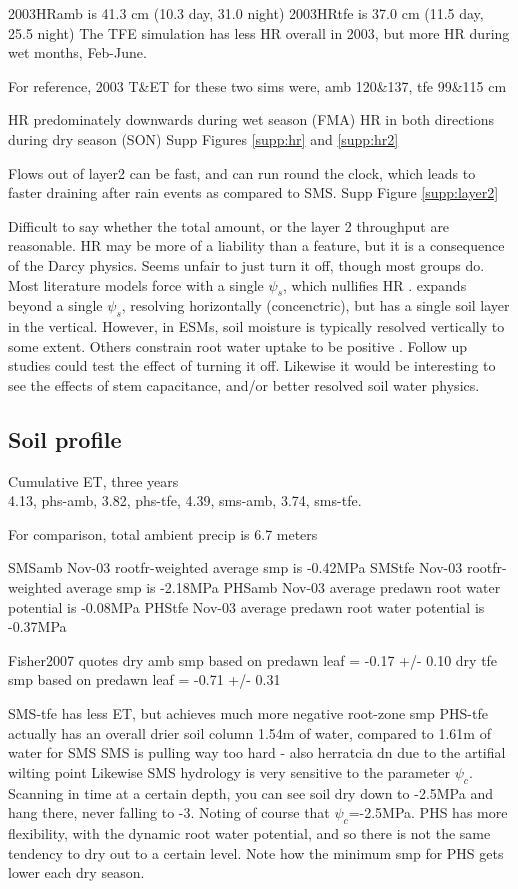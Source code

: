 \documentclass[draft,linenumbers]{agujournal}
\begin{document}
2003HRamb is 41.3 cm (10.3 day, 31.0 night)
2003HRtfe is 37.0 cm (11.5 day, 25.5 night)
The TFE simulation has less HR overall in 2003, but more HR during wet months, Feb-June.

For reference,
2003 T\&ET for these two sims were, amb 120\&137, tfe 99\&115 cm

HR predominately downwards during wet season (FMA)
HR in both directions during dry season (SON)
Supp Figures \ref{supp:hr} and \ref{supp:hr2}

Flows out of layer2 can be fast, and can run round the clock, which leads to faster draining after rain events as compared to SMS.
Supp Figure \ref{supp:layer2}

Difficult to say whether the total amount, or the layer 2 throughput are reasonable.
HR may be more of a liability than a feature, but it is a consequence of the Darcy physics.
Seems unfair to just turn it off, though most groups do.
Most literature models force with a single $\psi_s$, which nullifies HR \citep{fisher2007,bonan2014,sperry2017}.
\cite{christoffersen2016} expands beyond a single $\psi_s$, resolving horizontally (concenctric), but has a single soil layer in the vertical.
However, in ESMs, soil moisture is typically resolved vertically to some extent.
Others constrain root water uptake to be positive \citep{xu2016}.
Follow up studies could test the effect of turning it off.
Likewise it would be interesting to see the effects of stem capacitance, and/or better resolved soil water physics.


\subsection{Soil profile}

Cumulative ET, three years \\
    4.13, phs-amb,
    3.82, phs-tfe,
    4.39, sms-amb,
    3.74, sms-tfe.

For comparison, total ambient precip is 6.7 meters

SMSamb Nov-03 rootfr-weighted average smp is -0.42MPa
SMStfe Nov-03 rootfr-weighted average smp is -2.18MPa
PHSamb Nov-03 average predawn root water potential is -0.08MPa
PHStfe Nov-03 average predawn root water potential is -0.37MPa

Fisher2007 quotes dry amb smp based on predawn leaf = -0.17 +/- 0.10
dry tfe smp based on predawn leaf = -0.71 +/- 0.31

SMS-tfe has less ET, but achieves much more negative root-zone smp
PHS-tfe actually has an overall drier soil column 1.54m of water, compared to 1.61m of water for SMS
SMS is pulling way too hard - also herratcia dn due to the artifial wilting point
Likewise SMS hydrology is very sensitive to the parameter $\psi_c$. 
Scanning in time at a certain depth, you can see soil dry down to -2.5MPa and hang there, never falling to -3.
Noting of course that $\psi_c$=-2.5MPa.
PHS has more flexibility, with the dynamic root water potential, and so there is not the same tendency to dry out to a certain level.
Note how the minimum smp for PHS gets lower each dry season.
\end{document}
